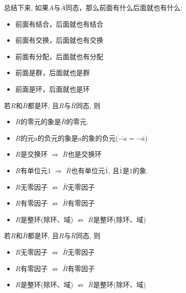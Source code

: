 \begin{Remark}
总结下来, 如果$A$与$\bar{A}$同态，那么前面有什么后面就也有什么:
\begin{itemize}
	\item 前面有结合，后面就也有结合
	\item 前面有交换，后面就也有交换
	\item 前面有分配，后面就也有分配
	\item 前面是群，后面就也是群
	\item 前面是环，后面就也是环
\end{itemize}
\end{Remark}

\begin{Theorem}
若$R$和$\bar{R}$都是环, 且$R$与$\bar{R}$同态, 则
\begin{itemize}
	\item $R$的零元的象是$\bar{R}$的零元.
	\item $R$的元$a$的负元的象是$a$的象的负元{($\overline{-a} = -\overline{a}$)}
	\item $R$是交换环 $\Rightarrow$ $\bar{R}$也是交换环
	\item $R$有单位元$\mathfrak{1}$ $\Rightarrow$ $\bar{R}$也有单位元$\bar{\mathfrak{1}}$, 且$\bar{\mathfrak{1}}$是$\mathfrak{1}$的象.
	\item $R$无零因子 $\not\Rightarrow$ $\bar{R}$无零因子
	\item $R$有零因子 $\not\Rightarrow$ $\bar{R}$有零因子
	\item $R$是整环(除环、域) $\not\Rightarrow$ $\bar{R}$是整环(除环、域)
\end{itemize}
\end{Theorem}

\begin{Proposition}
若$R$和$\bar{R}$都是环, 且$R$与$\bar{R}$同态, 则
\begin{itemize}
	\item $R$无零因子 $\not\Rightarrow$ $\bar{R}$无零因子
	\item $R$有零因子 $\not\Rightarrow$ $\bar{R}$有零因子
	\item $R$是整环(除环、域) $\not\Rightarrow$ $\bar{R}$是整环(除环、域)
\end{itemize}
\end{Proposition}